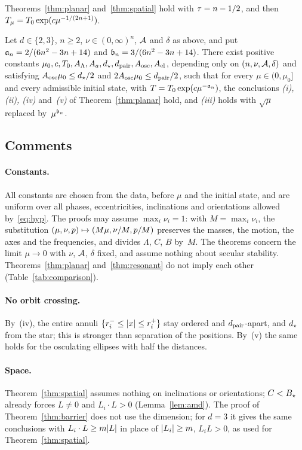 \begin{corollary}[Exponent $\nf{1}{(2n+1)}$]\label{cor:half}
Theorems~\ref{thm:planar} and~\ref{thm:spatial} hold with $\tau=n-1/2$, and then $T_\mu=T_0\exp(c\mu^{-1/(2n+1)})$.
\end{corollary}

\begin{theorem}\label{thm:resonant}
Let $d\in\{2,3\}$, $n\geq 2$, $\nu\in(0,\infty)^n$, $\mathcal{A}$ and $\delta$ as above, and put $\mathfrak{a}_n{}=2/(6n^2-3n+14)$ and $\mathfrak{b}_n{}=3/(6n^2-3n+14)$. There exist positive constants $\mu_0,c,T_0,A_\Lambda,A_a,d_\star,d_{\mathrm{pair}},A_{\mathrm{osc}},A_{\mathrm{el}}$, depending only on $(n,\nu,\mathcal{A},\delta)$ and satisfying $A_{\mathrm{osc}}\mu_0\leq d_\star/2$ and $2A_{\mathrm{osc}}\mu_0\leq d_{\mathrm{pair}}/2$, such that for every $\mu\in(0,\mu_0]$ and every admissible initial state, with $T=T_0\exp(c\mu^{-\mathfrak{a}_n{}})$, the conclusions \emph{(i), (ii), (iv)} and~\emph{(v)} of Theorem~\ref{thm:planar} hold, and \emph{(iii)} holds with $\sqrt\mu$ replaced by~$\mu^{\mathfrak{b}_n{}}$.
\end{theorem}

\subsection{Comments}

\paragraph{Constants.} All constants are chosen from the data, before $\mu$ and the initial state, and are uniform over all phases, eccentricities, inclinations and orientations allowed by~\eqref{eq:hyp}. The proofs may assume $\max_i\nu_i=1$: with $M=\max_i\nu_i$, the substitution $(\mu,\nu,p)\mapsto(M\mu,\nu/M,p/M)$ preserves the masses, the motion, the axes and the frequencies, and divides $\Lambda$, $C$, $B$ by~$M$. The theorems concern the limit $\mu\to0$ with $\nu$, $\mathcal{A}$, $\delta$ fixed, and assume nothing about secular stability. Theorems~\ref{thm:planar} and~\ref{thm:resonant} do not imply each other (Table~\ref{tab:comparison}).

\paragraph{No orbit crossing.} By~(iv), the entire annuli $\{r_i^-\leq\lvert x\rvert\leq r_i^+\}$ stay ordered and $d_{\mathrm{pair}}$-apart, and $d_\star$ from the star; this is stronger than separation of the positions. By~(v) the same holds for the osculating ellipses with half the distances.

\paragraph{Space.} Theorem~\ref{thm:spatial} assumes nothing on inclinations or orientations; $C<B_\star$ already forces $L\neq0$ and $L_i\cdot L>0$ (Lemma~\ref{lem:amd}). The proof of Theorem~\ref{thm:barrier} does not use the dimension; for $d=3$ it gives the same conclusions with $L_i\cdot L\geq m\lvert L\rvert$ in place of $\lvert L_i\rvert\geq m$, $L_iL>0$, as used for Theorem~\ref{thm:spatial}.
